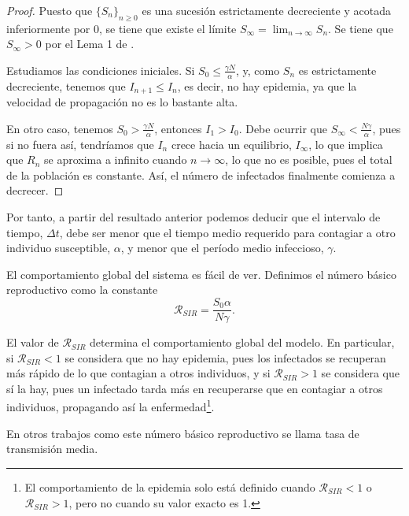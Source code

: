 \begin{proof}

Puesto que $\{S_n\}_{n\geq 0}$ es una sucesión estrictamente decreciente y acotada inferiormente por $0$, se tiene que existe el límite $\displaystyle S_\infty = \lim_{n \rightarrow \infty} S_n$. Se tiene que $S_\infty > 0$ por el Lema 1 de \cite{allenDiscretetimeSISIR1994}.

Estudiamos las condiciones iniciales. Si $S_0\leq \frac{\gamma N}{\alpha}$, y, como $S_n$ es estrictamente decreciente, tenemos que $I_{n+1}\leq I_n$, es decir, no hay epidemia, ya que la velocidad de propagación no es lo bastante alta.

En otro caso, tenemos $S_0> \frac{\gamma N}{\alpha}$, entonces $I_1>I_0$. Debe ocurrir que $S_\infty <\frac{N\gamma}{\alpha}$, pues si no fuera así, tendríamos que $I_n$ crece hacia un equilibrio, $I_\infty$, lo que implica que $R_n$ se aproxima a infinito cuando $n\rightarrow\infty$, lo que no es posible, pues el total de la población es constante. Así, el número de infectados finalmente comienza a decrecer.
\end{proof}

Por tanto, a partir del resultado anterior podemos deducir que el intervalo de tiempo, $\Delta t$, debe ser menor que el tiempo medio requerido para contagiar a otro individuo susceptible, $\alpha$, y menor que el período medio infeccioso, $\gamma$.


El comportamiento global del sistema es fácil de ver. Definimos el número básico reproductivo como la constante 
$$\mathcal{R}_{SIR}=\frac{S_0 \alpha}{N\gamma }.$$

El valor de $\mathcal{R}_{SIR}$ determina el comportamiento global del modelo. En particular, si $\mathcal{R}_{SIR}<1$ se considera que no hay epidemia, pues los infectados se recuperan más rápido de lo que contagian a otros individuos, y si $\mathcal{R}_{SIR}>1$ se considera que sí la hay, pues un infectado tarda más en recuperarse que en contagiar a otros individuos, propagando así la enfermedad\footnote{El comportamiento de la epidemia solo está definido cuando $\mathcal{R}_{SIR}<1$ o $\mathcal{R}_{SIR}>1$, pero no cuando su valor exacto es 1.}.

En otros trabajos como \cite{demongeotSIEpidemicModel} este número básico reproductivo se llama tasa de transmisión media.



